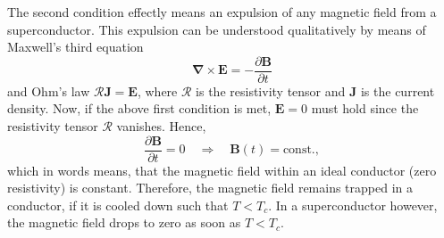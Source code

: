 \documentclass{report}
\numberwithin{tm}{section}
\newcommand\matr[1]{\ensuremath{\boldsymbol{\mathbf{#1}}}}
\newcommand\vect[1]{\ensuremath{\bm{#1}}}
\begin{document}
The second condition effectly means an expulsion of any magnetic field from a superconductor. This expulsion can be understood qualitatively by means of Maxwell's third equation \begin{equation}
	\vect{\nabla}\times \vect{E}  = -\frac{\partial \vect{B}}{\partial t}
\end{equation} and Ohm's law $\matr{\mathcal{R}}\vect{J} = \vect{E}$, where $\matr{\mathcal{R}}$ is the resistivity tensor and $\vect{J}$ is the current density. Now, if the above first condition is met, $\vect{E} = 0$ must hold since the resistivity tensor $\matr{\mathcal{R}}$ vanishes. Hence, \begin{equation}
	\frac{\partial \vect{B}}{\partial t} = 0 \quad \Rightarrow \quad \vect{B}(t) = \text{const.},
\end{equation} which in words means, that the magnetic field within an ideal conductor (zero resistivity) is constant. Therefore, the magnetic field remains trapped in a conductor, if it is cooled down such that $T < T_c$. In a superconductor however, the magnetic field drops to zero as soon as $T < T_c$.
\end{document}
